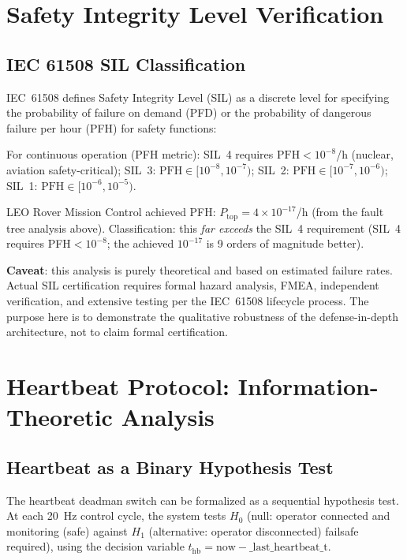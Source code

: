 \section{Safety Integrity Level Verification}

\subsection{IEC 61508 SIL Classification}

IEC~61508 defines Safety Integrity Level (SIL) as a discrete level for specifying the probability of failure on demand (PFD) or the probability of dangerous failure per hour (PFH) for safety functions:

\begin{eqblock}
For continuous operation (PFH metric): SIL~4 requires $\text{PFH}<10^{-8}$/h (nuclear, aviation safety-critical); SIL~3: $\text{PFH}\in[10^{-8},10^{-7})$; SIL~2: $\text{PFH}\in[10^{-7},10^{-6})$; SIL~1: $\text{PFH}\in[10^{-6},10^{-5})$.

LEO Rover Mission Control achieved PFH: $P_{\text{top}} = 4\times10^{-17}$/h (from the fault tree analysis above). Classification: this \emph{far exceeds} the SIL~4 requirement (SIL~4 requires PFH$<10^{-8}$; the achieved $10^{-17}$ is 9 orders of magnitude better).
\end{eqblock}

\textbf{Caveat}: this analysis is purely theoretical and based on estimated failure rates. Actual SIL certification requires formal hazard analysis, FMEA, independent verification, and extensive testing per the IEC~61508 lifecycle process. The purpose here is to demonstrate the qualitative robustness of the defense-in-depth architecture, not to claim formal certification.

\section{Heartbeat Protocol: Information-Theoretic Analysis}

\subsection{Heartbeat as a Binary Hypothesis Test}

The heartbeat deadman switch can be formalized as a sequential hypothesis test. At each 20~Hz control cycle, the system tests $H_0$ (null: operator connected and monitoring (safe) against $H_1$ (alternative: operator disconnected) failsafe required), using the decision variable $t_{\text{hb}} = \text{now} - \text{\_last\_heartbeat\_t}$.

